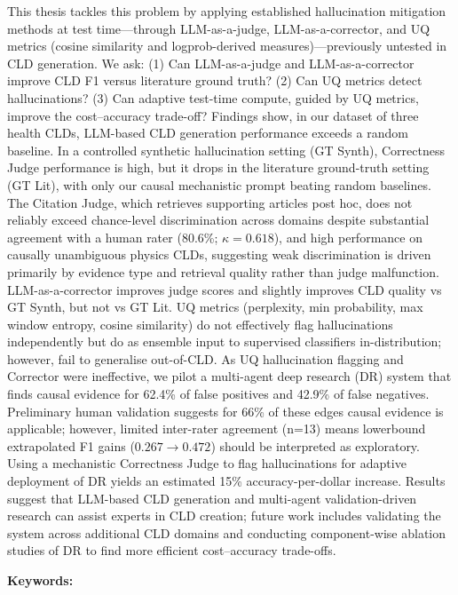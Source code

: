\documentclass[11pt, oneside]{Thesis} %
\begin{document}
{This thesis tackles this problem by applying established hallucination mitigation methods at test time---through LLM-as-a-judge, LLM-as-a-corrector, and UQ metrics (cosine similarity and logprob-derived measures)---previously untested in CLD generation. We ask: (1) Can LLM-as-a-judge and LLM-as-a-corrector improve CLD F1 versus literature ground truth? (2) Can UQ metrics detect hallucinations? (3) Can adaptive test-time compute, guided by UQ metrics, improve the cost--accuracy trade-off? Findings show, in our dataset of three health CLDs, LLM-based CLD generation performance exceeds a random baseline. In a controlled synthetic hallucination setting (GT Synth), Correctness Judge performance is high, but it drops in the literature ground-truth setting (GT Lit), with only our causal mechanistic prompt beating random baselines. The Citation Judge, which retrieves supporting articles post hoc, does not reliably exceed chance-level discrimination across domains despite substantial agreement with a human rater (80.6\%; $\kappa=0.618$), and high performance on causally unambiguous physics CLDs, suggesting weak discrimination is driven primarily by evidence type and retrieval quality rather than judge malfunction. LLM-as-a-corrector improves judge scores and slightly improves CLD quality vs GT Synth, but not vs GT Lit. UQ metrics (perplexity, min probability, max window entropy, cosine similarity) do not effectively flag hallucinations independently but do as ensemble input to supervised classifiers in-distribution; however, fail to generalise out-of-CLD. As UQ hallucination flagging and Corrector were ineffective, we pilot a multi-agent deep research (DR) system that finds causal evidence for 62.4\% of false positives and 42.9\% of false negatives. Preliminary human validation suggests for 66\% of these edges causal evidence is applicable; however, limited inter-rater agreement (n=13) means lowerbound extrapolated F1 gains ($0.267 \to 0.472$) should be interpreted as exploratory. Using a mechanistic Correctness Judge to flag hallucinations for adaptive deployment of DR yields an estimated 15\% accuracy-per-dollar increase. Results suggest that LLM-based CLD generation and multi-agent validation-driven research can assist experts in CLD creation; future work includes validating the system across additional CLD domains and conducting component-wise ablation studies of DR to find more efficient cost--accuracy trade-offs.

\vspace{0.75em}
\noindent\textbf{Keywords:} \keywordnames
}
\end{document}
